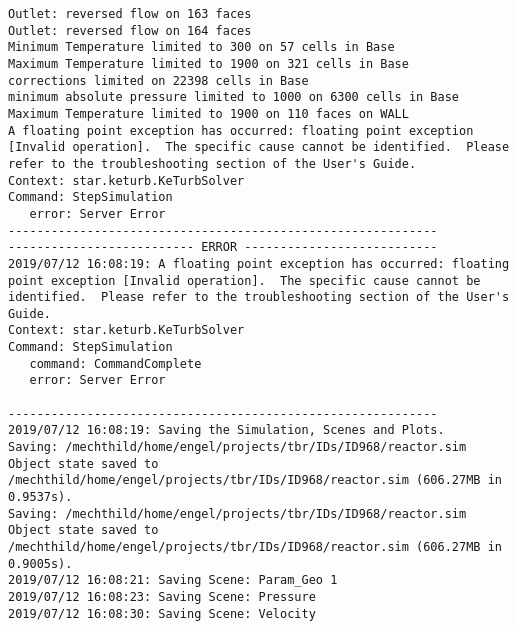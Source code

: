 \documentclass{article}
\begin{document}
{\begin{verbatim}
Outlet: reversed flow on 163 faces 
Outlet: reversed flow on 164 faces 
Minimum Temperature limited to 300 on 57 cells in Base
Maximum Temperature limited to 1900 on 321 cells in Base
corrections limited on 22398 cells in Base
minimum absolute pressure limited to 1000 on 6300 cells in Base
Maximum Temperature limited to 1900 on 110 faces on WALL
A floating point exception has occurred: floating point exception [Invalid operation].  The specific cause cannot be identified.  Please refer to the troubleshooting section of the User's Guide.
Context: star.keturb.KeTurbSolver
Command: StepSimulation
   error: Server Error
------------------------------------------------------------
-------------------------- ERROR ---------------------------
2019/07/12 16:08:19: A floating point exception has occurred: floating point exception [Invalid operation].  The specific cause cannot be identified.  Please refer to the troubleshooting section of the User's Guide.
Context: star.keturb.KeTurbSolver
Command: StepSimulation
   command: CommandComplete
   error: Server Error

------------------------------------------------------------
2019/07/12 16:08:19: Saving the Simulation, Scenes and Plots.
Saving: /mechthild/home/engel/projects/tbr/IDs/ID968/reactor.sim
Object state saved to /mechthild/home/engel/projects/tbr/IDs/ID968/reactor.sim (606.27MB in 0.9537s).
Saving: /mechthild/home/engel/projects/tbr/IDs/ID968/reactor.sim
Object state saved to /mechthild/home/engel/projects/tbr/IDs/ID968/reactor.sim (606.27MB in 0.9005s).
2019/07/12 16:08:21: Saving Scene: Param_Geo 1
2019/07/12 16:08:23: Saving Scene: Pressure
2019/07/12 16:08:30: Saving Scene: Velocity
\end{verbatim}
}
\clearpage
\end{document}
